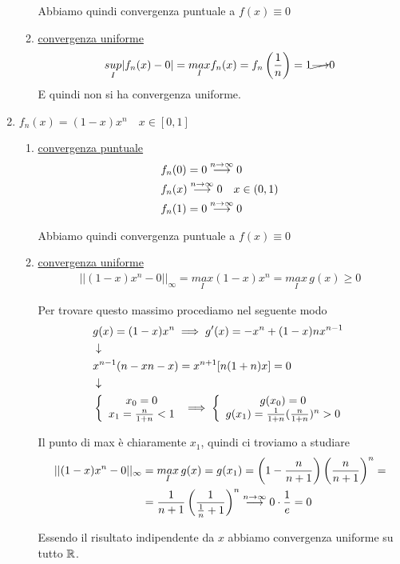 \begin{enumerate}
\begin{enumerate}
	Abbiamo quindi convergenza puntuale a $f(x) \equiv 0$
	\item \underline{convergenza uniforme}
	\begin{align}
	\underset{I}{sup} |f_n(x)-0|= \underset{I}{max}f_n(x)=f_n\left(\frac{1}{n}\right)=1 \cancel{\longrightarrow} 0
	\end{align}
		E quindi non si ha convergenza uniforme.
	
	\end{enumerate}
	
	\item $f_n(x)= (1-x)x^n \quad x \in [0,1]$
	\begin{enumerate}
		\item \underline{convergenza puntuale}
		\begin{align}
		{}&f_n(0) = 0  \overset{n \rightarrow \infty}{\longrightarrow}0 \\
		&f_n(x) \overset{n \rightarrow \infty}{\longrightarrow}0 \quad x\in (0,1)\\
		&f_n(1)= 0 \overset{n \rightarrow \infty}{\longrightarrow}0 
		\end{align}
		
		Abbiamo quindi convergenza puntuale a $f(x)\equiv 0$
		
		\item \underline{convergenza uniforme}
		\begin{align}
		||(1-x)x^n  - 0||_\infty = \underset{I}{max} (1-x)x^n = \underset{I}{max}\, g(x) \geq 0 
		\end{align}
		
		Per trovare questo massimo procediamo nel seguente modo
		\begin{align}
		{}&g(x)= (1-x)x^n 	\implies g'(x)= -x^n + (1-x)nx^{n-1} \nonumber \\ &\downarrow \nonumber \\
		& x^{n-1} (n-xn-x) = x^{n+1}[n(1+n)x]=0 \nonumber \\ &\downarrow \nonumber \\ &\left\{\begin{array}{cc} x_0=0 \\ x_1=\frac{n}{1+n}<1 \end{array}\right. \implies \left\{\begin{array}{cc} g(x_0)=0 \\ g(x_1)= \frac{1}{1+n} (\frac{n}{1+n})^n >0 \end{array}\right.
		\end{align}
				
		Il punto di max è chiaramente $x_1$, quindi ci troviamo a studiare		
		\begin{align}
		||(1-x)x^n  - 0||_\infty {}&= \underset{I}{max}\, g(x) = g(x_1)= \left(1-\frac{n}{n+1}\right) \left(\frac{n}{n+1}\right)^n= \nonumber \\
		&= \frac{1}{n+1}\left(\frac{1}{\frac{1}{n} +1}\right)^n \overset{n \rightarrow \infty}{\longrightarrow} 0 \cdot \frac{1}{e}=0
		\end{align}
		
		Essendo il risultato indipendente da $x$ abbiamo convergenza uniforme su tutto $\mathbb{R}$.		
	\end{enumerate}
	

\end{enumerate}
